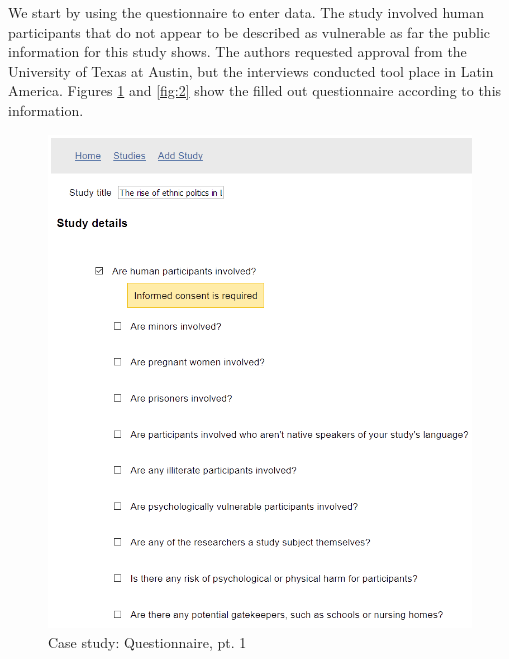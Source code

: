 \documentclass[10pt]{article}
\begin{document}
We start by using the questionnaire to enter data. The study involved human participants that do not appear to be described as vulnerable as far the public information for this study shows. The authors requested approval from the University of Texas at Austin, but the interviews conducted tool place in Latin America. Figures \ref{fig:1} and \ref{fig:2} show the filled out questionnaire according to this information.
\begin{figure}[H]
\centering
	\includegraphics[width=1\textwidth]{img/1.png}
		\caption{Case study: Questionnaire, pt. 1}

	\label{fig:1}
\end{figure}
\end{document}
